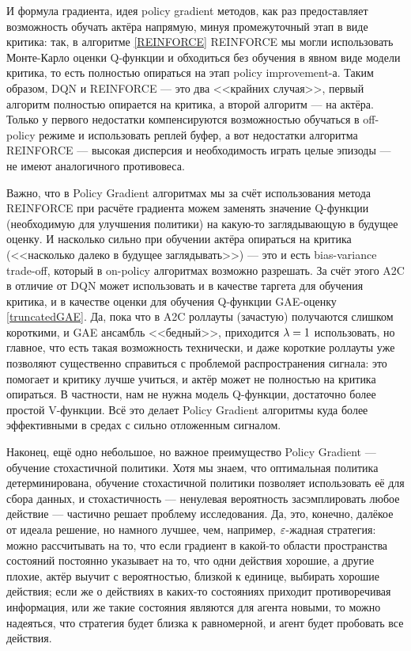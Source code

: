 И формула градиента, идея policy gradient методов, как раз предоставляет возможность обучать актёра напрямую, минуя промежуточный этап в виде критика: так, в алгоритме \ref{REINFORCE} REINFORCE мы могли использовать Монте-Карло оценки Q-функции и обходиться без обучения в явном виде модели критика, то есть полностью опираться на этап policy improvement-а. Таким образом, DQN и REINFORCE --- это два <<крайних случая>>, первый алгоритм полностью опирается на критика, а второй алгоритм --- на актёра. Только у первого недостатки компенсируются возможностью обучаться в off-policy режиме и использовать реплей буфер, а вот недостатки алгоритма REINFORCE --- высокая дисперсия и необходимость играть целые эпизоды --- не имеют аналогичного противовеса. 

Важно, что в Policy Gradient алгоритмах мы за счёт использования метода REINFORCE при расчёте градиента можем заменять значение Q-функции (необходимую для улучшения политики) на какую-то заглядывающую в будущее оценку. И насколько сильно при обучении актёра опираться на критика (<<насколько далеко в будущее заглядывать>>) --- это и есть bias-variance trade-off, который в on-policy алгоритмах возможно разрешать. За счёт этого A2C в отличие от DQN может использовать и в качестве таргета для обучения критика, и в качестве оценки для обучения Q-функции GAE-оценку \eqref{truncatedGAE}. Да, пока что в A2C роллауты (зачастую) получаются слишком короткими, и GAE ансамбль <<бедный>>, приходится $\lambda \HM= 1$ использовать, но главное, что есть такая возможность технически, и даже короткие роллауты уже позволяют существенно справиться с проблемой распространения сигнала: это помогает и критику лучше учиться, и актёр может не полностью на критика опираться. В частности, нам не нужна модель Q-функции, достаточно более простой V-функции. Всё это делает Policy Gradient алгоритмы куда более эффективными в средах с сильно отложенным сигналом.

Наконец, ещё одно небольшое, но важное преимущество Policy Gradient --- обучение стохастичной политики. Хотя мы знаем, что оптимальная политика детерминирована, обучение стохастичной политики позволяет использовать её для сбора данных, и стохастичность --- ненулевая вероятность засэмплировать любое действие --- частично решает проблему исследования. Да, это, конечно, далёкое от идеала решение, но намного лучшее, чем, например, $\varepsilon$-жадная стратегия: можно рассчитывать на то, что если градиент в какой-то области пространства состояний постоянно указывает на то, что одни действия хорошие, а другие плохие, актёр выучит с вероятностью, близкой к единице, выбирать хорошие действия; если же о действиях в каких-то состояниях приходит противоречивая информация, или же такие состояния являются для агента новыми, то можно надеяться, что стратегия будет близка к равномерной, и агент будет пробовать все действия.

